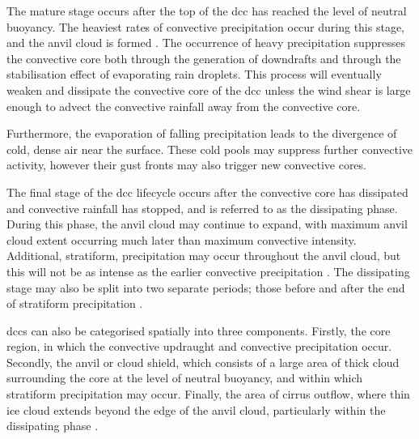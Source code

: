 The mature stage occurs after the top of the \acrshort{dcc} has reached the level of neutral buoyancy.
The heaviest rates of convective precipitation occur during this stage, and the anvil cloud is formed \citep{houze_chapter_2014}.
The occurrence of heavy precipitation suppresses the convective core both through the generation of downdrafts and through the stabilisation effect of evaporating rain droplets.
This process will eventually weaken and dissipate the convective core of the \acrshort{dcc} unless the wind shear is large enough to advect the convective rainfall away from the convective core.

Furthermore, the evaporation of falling precipitation leads to the divergence of cold, dense air near the surface.
These cold pools may suppress further convective activity, however their gust fronts may also trigger new convective cores.

The final stage of the \acrshort{dcc} lifecycle occurs after the convective core has dissipated and convective rainfall has stopped, and is referred to as the dissipating phase.
During this phase, the anvil cloud may continue to expand, with maximum anvil cloud extent occurring much later than maximum convective intensity.
Additional, stratiform, precipitation may occur throughout the anvil cloud, but this will not be as intense as the earlier convective precipitation \citep{houze_chapter_2014}.
The dissipating stage may also be split into two separate periods; those before and after the end of stratiform precipitation \citep{wall_life_2018}.

\acrshort{dcc}s can also be categorised spatially into three components.
Firstly, the core region, in which the convective updraught and convective precipitation occur.
Secondly, the anvil or cloud shield, which consists of a large area of thick cloud surrounding the core at the level of neutral buoyancy, and within which stratiform precipitation may occur.
Finally, the area of cirrus outflow, where thin ice cloud extends beyond the edge of the anvil cloud, particularly within the dissipating phase \citep{lilly_cirrus_1988}.

